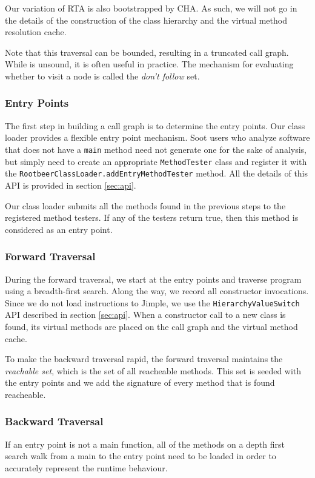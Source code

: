 \documentclass{sigplanconf}
\begin{document}
Our variation of RTA is also bootstrapped by CHA. As such, we will not go in the details of the construction of the class hierarchy and the virtual method resolution cache.

Note that this traversal can be bounded, resulting in a truncated call graph. While is unsound, it is often useful in practice. The mechanism for evaluating whether to visit a node is called the \emph{don't follow} set.

\subsubsection{Entry Points}
The first step in building a call graph is to determine the entry points. Our class loader provides a flexible entry point mechanism. Soot users who analyze software that does not have a {\tt main} method need not generate one for the sake of analysis, but simply need to create an appropriate {\tt MethodTester} class and register it with the {\tt RootbeerClassLoader.addEntryMethodTester} method. All the details of this API is provided in section \ref{sec:api}.

Our class loader submits all the methods found in the previous steps to the registered method testers. If any of the testers return true, then this method is considered as an entry point.

\subsubsection{Forward Traversal}

During the forward traversal, we start at the entry points and traverse program using a breadth-first search. Along the way, we record all constructor invocations. Since we do not load instructions to Jimple, we use the {\tt HierarchyValueSwitch} API described in section \ref{sec:api}.
When a constructor call to a new class is found, its virtual methods are placed on the call graph and the virtual method cache.

To make the backward traversal rapid, the forward traversal maintains the \emph{reachable set}, which is the set of all reacheable methods. This set is seeded with the entry points and we add the signature of every method that is found reacheable.


\subsubsection{Backward Traversal}
If an entry point is not a main function, all of the methods on a depth first search walk from a main to the entry point need to be loaded in order to accurately represent the runtime behaviour.
\end{document}
